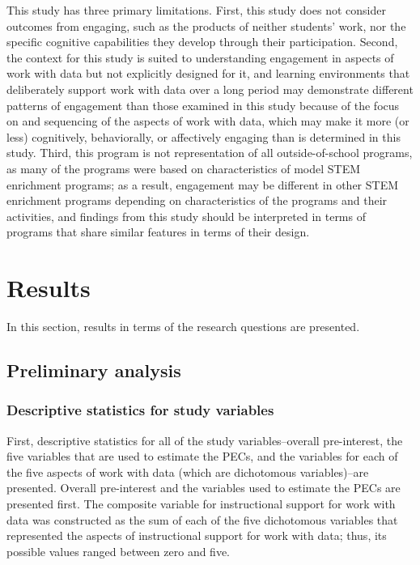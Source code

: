 \documentclass[]{book}
\theoremstyle{definition}
\theoremstyle{definition}
\theoremstyle{definition}
\theoremstyle{remark}
\begin{document}
This study has three primary limitations. First, this study does not
consider outcomes from engaging, such as the products of neither
students' work, nor the specific cognitive capabilities they develop
through their participation. Second, the context for this study is
suited to understanding engagement in aspects of work with data but not
explicitly designed for it, and learning environments that deliberately
support work with data over a long period may demonstrate different
patterns of engagement than those examined in this study because of the
focus on and sequencing of the aspects of work with data, which may make
it more (or less) cognitively, behaviorally, or affectively engaging
than is determined in this study. Third, this program is not
representation of all outside-of-school programs, as many of the
programs were based on characteristics of model STEM enrichment
programs; as a result, engagement may be different in other STEM
enrichment programs depending on characteristics of the programs and
their activities, and findings from this study should be interpreted in
terms of programs that share similar features in terms of their design.

\chapter{Results}\label{results}

In this section, results in terms of the research questions are
presented.

\section{Preliminary analysis}\label{preliminary-analysis}

\subsection{Descriptive statistics for study
variables}\label{descriptive-statistics-for-study-variables}

First, descriptive statistics for all of the study variables--overall
pre-interest, the five variables that are used to estimate the PECs, and
the variables for each of the five aspects of work with data (which are
dichotomous variables)--are presented. Overall pre-interest and the
variables used to estimate the PECs are presented first. The composite
variable for instructional support for work with data was constructed as
the sum of each of the five dichotomous variables that represented the
aspects of instructional support for work with data; thus, its possible
values ranged between zero and five.
\end{document}
